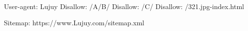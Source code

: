 User-agent: Lujuy
Disallow: /A/B/
Disallow: /C/
Disallow: /321.jpg-index.html

Sitemap: https://www.Lujuy.com/sitemap.xml
